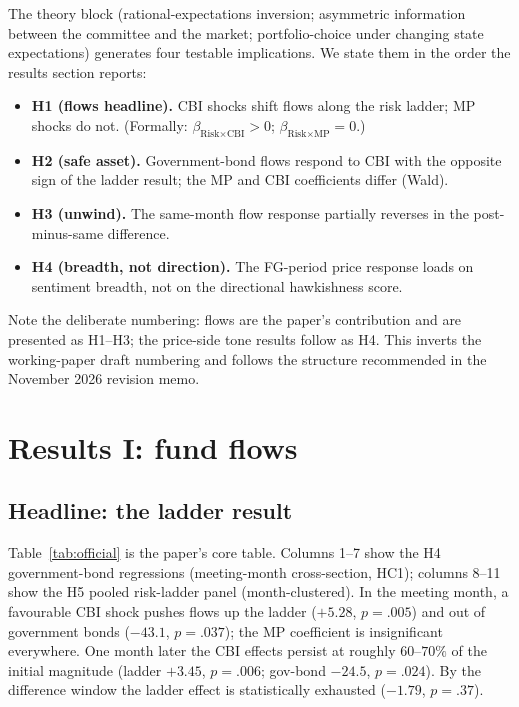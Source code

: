 \documentclass[11pt]{article}
\begin{document}
The theory block (rational-expectations inversion; asymmetric information
between the committee and the market; portfolio-choice under changing state
expectations) generates four testable implications. We state them in the
order the results section reports:

\begin{itemize}
\item \textbf{H1 (flows headline).} CBI shocks shift flows along the risk
ladder; MP shocks do not. (Formally: $\beta_{\text{Risk}\times\text{CBI}}>0$;
$\beta_{\text{Risk}\times\text{MP}}=0$.)
\item \textbf{H2 (safe asset).} Government-bond flows respond to CBI with the
opposite sign of the ladder result; the MP and CBI coefficients differ
(Wald).
\item \textbf{H3 (unwind).} The same-month flow response partially reverses
in the post-minus-same difference.
\item \textbf{H4 (breadth, not direction).} The FG-period price response loads
on sentiment breadth, not on the directional hawkishness score.
\end{itemize}

Note the deliberate numbering: flows are the paper's contribution and are
presented as H1--H3; the price-side tone results follow as H4. This inverts
the working-paper draft numbering and follows the structure recommended in
the November 2026 revision memo.

\section{Results I: fund flows}\label{sec:flows}

\subsection{Headline: the ladder result}\label{sec:ladder}

Table~\ref{tab:official} is the paper's core table. Columns 1--7 show the
H4 government-bond regressions (meeting-month cross-section, HC1); columns
8--11 show the H5 pooled risk-ladder panel (month-clustered). In the meeting
month, a favourable CBI shock pushes flows up the ladder ($+5.28$, $p=.005$)
and out of government bonds ($-43.1$, $p=.037$); the MP coefficient is
insignificant everywhere. One month later the CBI effects persist at roughly
$60$--$70\%$ of the initial magnitude (ladder $+3.45$, $p=.006$; gov-bond
$-24.5$, $p=.024$). By the difference window the ladder effect is statistically
exhausted ($-1.79$, $p=.37$).
\end{document}

